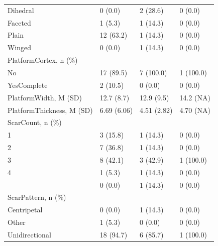 \documentclass[12pt,twoside]{reedthesis}
\begin{document}
\begin{longtable}[t]{llll}
Dihedral & 0 (0.0) & 2 (28.6) & 0 (0.0)\\
Faceted & 1 (5.3) & 1 (14.3) & 0 (0.0)\\
Plain & 12 (63.2) & 1 (14.3) & 0 (0.0)\\
Winged & 0 (0.0) & 1 (14.3) & 0 (0.0)\\
\addlinespace
PlatformCortex, n (\%) &  &  & \\
No & 17 (89.5) & 7 (100.0) & 1 (100.0)\\
YesComplete & 2 (10.5) & 0 (0.0) & 0 (0.0)\\
PlatformWidth, M (SD) & 12.7 (8.7) & 12.9 (9.5) & 14.2 (NA)\\
PlatformThickness, M (SD) & 6.69 (6.06) & 4.51 (2.82) & 4.70 (NA)\\
\addlinespace
ScarCount, n (\%) &  &  & \\
1 & 3 (15.8) & 1 (14.3) & 0 (0.0)\\
2 & 7 (36.8) & 1 (14.3) & 0 (0.0)\\
3 & 8 (42.1) & 3 (42.9) & 1 (100.0)\\
4 & 1 (5.3) & 1 (14.3) & 0 (0.0)\\
\addlinespace
5 & 0 (0.0) & 1 (14.3) & 0 (0.0)\\
ScarPattern, n (\%) &  &  & \\
Centripetal & 0 (0.0) & 1 (14.3) & 0 (0.0)\\
Other & 1 (5.3) & 0 (0.0) & 0 (0.0)\\
Unidirectional & 18 (94.7) & 6 (85.7) & 1 (100.0)\\
\bottomrule
\end{longtable}
\end{document}
